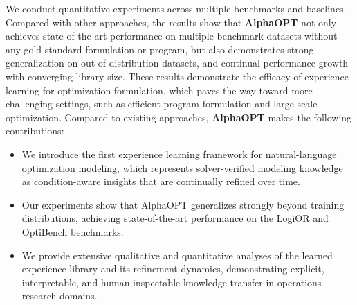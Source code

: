 \documentclass[sigconf, nonacm]{acmart}
\begin{document}
We conduct quantitative experiments across multiple benchmarks and baselines. Compared with other approaches, the results show that \textbf{AlphaOPT} not only achieves state-of-the-art performance on multiple benchmark datasets without any gold-standard formulation or program, but also demonstrates strong generalization on out-of-distribution datasets, and continual performance growth with converging library size. These results demonstrate the efficacy of experience learning for optimization formulation, which paves the way toward more challenging settings, such as efficient program formulation and large-scale optimization. Compared to existing approaches, \textbf{AlphaOPT} makes the following contributions:
\begin{itemize}
\item We introduce the first experience learning framework for natural-language optimization modeling, which represents solver-verified modeling knowledge as condition-aware insights that are continually refined over time.
\item Our experiments show that AlphaOPT generalizes strongly beyond training distributions, achieving state-of-the-art performance on the LogiOR and OptiBench benchmarks.
\item We provide extensive qualitative and quantitative analyses of the learned experience library and its refinement dynamics, demonstrating explicit, interpretable, and human-inspectable knowledge transfer in operations research domains.
\end{itemize}
\end{document}
